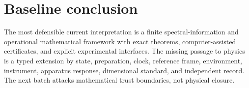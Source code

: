 \documentclass[11pt,a4paper]{article}
\begin{document}
\section{Baseline conclusion}
The most defensible current interpretation is a finite spectral-information
and operational mathematical framework with exact theorems,
computer-assisted certificates, and explicit experimental interfaces. The
missing passage to physics is a typed extension by state, preparation, clock,
reference frame, environment, instrument, apparatus response, dimensional
standard, and independent record. The next batch attacks mathematical trust
boundaries, not physical closure.
\end{document}
